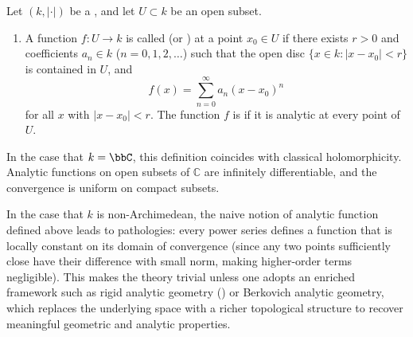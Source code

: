 \begin{definition} \label{definition:analytic_function_over_a_valued_field}
Let $(k, |\cdot|)$ be a , and let $U \subset k$ be an open subset.

\begin{enumerate}
    \item A function $f : U \to k$ is called  (or ) at a point $x_0 \in U$ if there exists $r > 0$ and coefficients $a_n \in k$ ($n = 0,1,2,\ldots$) such that the open disc $\{x \in k : |x - x_0| < r\}$ is contained in $U$, and
    $$f(x) = \sum_{n=0}^\infty a_n (x - x_0)^n$$
    for all $x$ with $|x - x_0| < r$. The function $f$ is  if it is analytic at every point of $U$.
\end{enumerate}

In the case that $k = \bbC$, this definition coincides with classical holomorphicity. Analytic functions on open subsets of $\mathbb{C}$ are infinitely differentiable, and the convergence is uniform on compact subsets.

In the case that $k$ is non-Archimedean, the naive notion of analytic function defined above leads to pathologies: every power series defines a function that is locally constant on its domain of convergence (since any two points sufficiently close have their difference with small norm, making higher-order terms negligible). This makes the theory trivial unless one adopts an enriched framework such as rigid analytic geometry () or Berkovich analytic geometry, which replaces the underlying space with a richer topological structure to recover meaningful geometric and analytic properties.
\end{definition}
